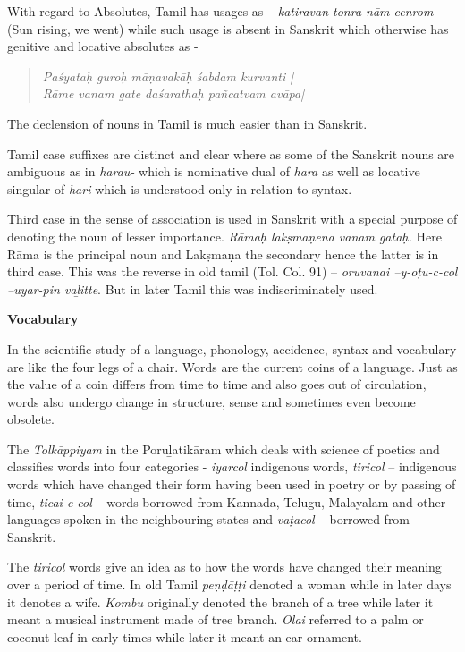 With regard to Absolutes, Tamil has usages as – \textit{katiravan tonra nām cenrom} (Sun rising, we went) while such usage is absent in Sanskrit which otherwise has genitive and locative absolutes as -

\begin{verse}
\textit{Paśyataḥ guroḥ māṇavakāḥ śabdam kurvanti |}\\\textit{Rāme vanam gate daśarathaḥ pañcatvam avāpa|}
\end{verse}

The declension of nouns in Tamil is much easier than in Sanskrit.

Tamil case suffixes are distinct and clear where as some of the Sanskrit nouns are ambiguous as in \textit{harau-} which is nominative dual of \textit{hara} as well as locative singular of \textit{hari} which is understood only in relation to syntax.

Third case in the sense of association is used in Sanskrit with a special purpose of denoting the noun of lesser importance. \textit{Rāmaḥ lakṣmaṇena vanam gataḥ.} Here Rāma is the principal noun and Lakṣmaṇa the secondary hence the latter is in third case. This was the reverse in old tamil (Tol. Col. 91) – \textit{oruvanai –y-oṭu-c-col –uyar-pin vaḻitte}. But in later Tamil this was indiscriminately used.

\textbf{Vocabulary}

In the scientific study of a language, phonology, accidence, syntax and vocabulary are like the four legs of a chair. Words are the current coins of a language. Just as the value of a coin differs from time to time and also goes out of circulation, words also undergo change in structure, sense and sometimes even become obsolete.

The \textit{Tolkāppiyam} in the Poruḻatikāram which deals with science of poetics and classifies words into four categories - \textit{iyarcol} indigenous words, \textit{tiricol} – indigenous words which have changed their form having been used in poetry or by passing of time, \textit{ticai-c-col} – words borrowed from Kannada, Telugu, Malayalam and other languages spoken in the neighbouring states and \textit{vaṭacol –} borrowed from Sanskrit.

The \textit{tiricol} words give an idea as to how the words have changed their meaning over a period of time. In old Tamil \textit{peṇḍāṭṭi} denoted a woman while in later days it denotes a wife. \textit{Kombu} originally denoted the branch of a tree while later it meant a musical instrument made of tree branch. \textit{Olai} referred to a palm or coconut leaf in early times while later it meant an ear ornament.

